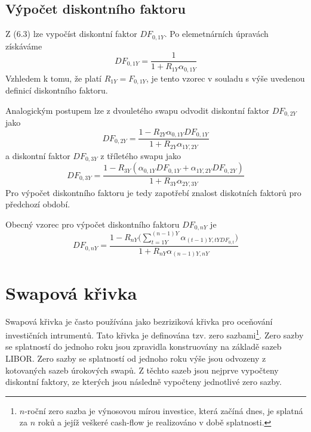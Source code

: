 \documentclass[a4paper]{book}
\begin{document}
\subsection{Výpočet diskontního faktoru}

Z (6.3) lze vypočíst diskontní faktor $DF_{0, 1Y}$. Po elemetnárních úpravách získáváme
\begin{equation*}
DF_{0, 1Y} = \frac{1}{1 + R_{1Y} \alpha_{0,1Y}}
\end{equation*}
Vzhledem k tomu, že platí $R_{1Y} = F_{0,1Y}$, je tento vzorec v souladu s výše uvedenou definicí diskontního faktoru.

Analogickým postupem lze z dvouletého swapu odvodit diskontní faktor $DF_{0,2Y}$ jako
\begin{equation*}
DF_{0,2Y} = \frac{1 - R_{2Y} \alpha_{0,1Y}DF_{0,1Y}}{1 + R_{2Y} \alpha_{1Y, 2Y}}
\end{equation*}
a diskontní faktor $DF_{0,3Y}$ z tříletého swapu jako
\begin{equation*}
DF_{0,3Y} = \frac{1 - R_{3Y}(\alpha_{0,1Y}DF_{0,1Y} + \alpha_{1Y,2Y}DF_{0,2Y})}{1 + R_{3Y} \alpha_{2Y, 3Y}}
\end{equation*}
Pro výpočet diskontního faktoru je tedy zapotřebí znalost diskotních faktorů pro předchozí období.

Obecný vzorec pro výpočet diskontního faktoru $DF_{0,nY}$ je
\begin{equation}
DF_{0,nY} = \frac{1 - R_{nY} \bigg( \sum_{t = 1Y}^{(n-1)Y} \alpha_{(t-1)Y,tY DF_{0,t}} \bigg)}{1 + R_{nY} \alpha_{(n-1)Y,nY}}
\end{equation}

\section{Swapová křivka}

Swapová křivka je často používána jako bezriziková křivka pro oceňování investičních intrumentů. Tato křivka je definována tzv. zero  sazbami\footnote{$n$-roční zero sazba je výnosovou mírou investice, která začíná dnes, je splatná za $n$ roků a jejíž veškeré cash-flow je realizováno v době splatnosti.}. Zero sazby se splatností do jednoho roku jsou zpravidla konstruovány na základě sazeb LIBOR. Zero sazby se splatností od jednoho roku výše jsou odvozeny z kotovaných sazeb úrokových swapů. Z těchto sazeb jsou nejprve vypočteny diskontní faktory, ze kterých jsou následně vypočteny jednotlivé zero sazby.
\end{document}
